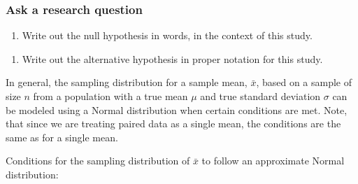 \documentclass[
]{report}
\providecommand{\tightlist}{%
  \setlength{\itemsep}{0pt}\setlength{\parskip}{0pt}}
\begin{document}
\subsubsection*{Ask a research question}\label{ask-a-research-question-5}

\begin{enumerate}
\def\labelenumi{\arabic{enumi}.}
\setcounter{enumi}{2}
\tightlist
\item
  Write out the null hypothesis in words, in the context of this study.
\end{enumerate}

\vspace{0.8in}

\begin{enumerate}
\def\labelenumi{\arabic{enumi}.}
\setcounter{enumi}{3}
\tightlist
\item
  Write out the alternative hypothesis in proper notation for this study.
\end{enumerate}

\vspace{0.5in}

In general, the sampling distribution for a sample mean, \(\bar{x}\), based on a sample of size \(n\) from a population with a true mean \(\mu\) and true standard deviation \(\sigma\) can be modeled using a Normal distribution when certain conditions are met. Note, that since we are treating paired data as a single mean, the conditions are the same as for a single mean.

Conditions for the sampling distribution of \(\bar{x}\) to follow an approximate Normal distribution:
\end{document}
